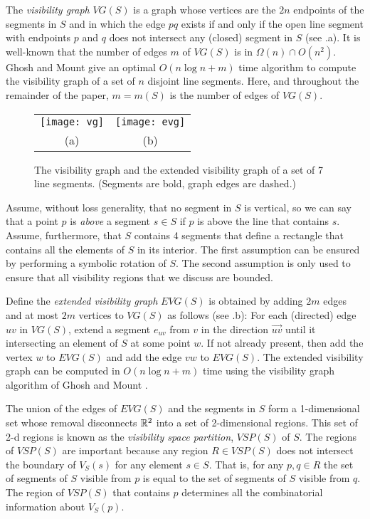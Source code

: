 \documentclass{patmorin}
\newcommand{\VG}{\mathit{VG}}
\newcommand{\EVG}{\mathit{EVG}}
\newcommand{\VSP}{\mathit{VSP}}
\begin{document}
The \emph{visibility graph} $\VG(S)$ is a graph whose vertices are the
$2n$ endpoints of the segments in $S$ and in which the edge $pq$ exists
if and only if the open line segment with endpoints $p$ and $q$ does
not intersect any (closed) segment in $S$ (see .a).  It is
well-known that the number of edges $m$ of $\VG(S)$ is in $\Omega(n)\cap
O(n^2)$.  Ghosh and Mount \cite{gm91} give an optimal $O(n\log n+ m)$
time algorithm to compute the visibility graph of a set of $n$ disjoint
line segments.  Here, and throughout the remainder of the paper, $m=m(S)$
is the number of edges of $\VG(S)$.

\begin{figure}
  \begin{center}
    \begin{tabular}{cc}
    \texttt{[image: vg]} & \texttt{[image: evg]} \\
    (a) & (b)
    \end{tabular}
  \end{center}
  \caption{The visibility graph and the extended visibility graph of a set
       of 7 line segments. (Segments are bold, graph edges are dashed.)}
\end{figure}

Assume, without loss generality, that no segment in $S$ is vertical, so
we can say that a point $p$ is \emph{above} a segment $s\in S$ if $p$ is
above the line that contains $s$.  Assume, furthermore, that $S$ contains
4 segments that define a rectangle that contains all the elements of $S$
in its interior.  The first assumption can be ensured by performing a
symbolic rotation of $S$.  The second assumption is only used to ensure
that all visibility regions that we discuss are bounded.

Define the \emph{extended visibility graph} $\EVG(S)$ is obtained
by adding $2m$ edges and at most $2m$ vertices to $\VG(S)$ as follows
(see .b): For each (directed) edge $uv$ in $\VG(S)$, extend a
segment $e_{uv}$ from $v$ in the direction $\overrightarrow{uv}$ until it
intersecting an element of $S$ at some point $w$.  If not already present,
then add the vertex $w$ to $\EVG(S)$ and add the edge $vw$ to $\EVG(S)$.
The extended visibility graph can be computed in $O(n\log n + m)$ time
using the visibility graph algorithm of Ghosh and Mount \cite{gm91}.

The union of the edges of $\EVG(S)$ and the segments in $S$ form a
1-dimensional set whose removal disconnects $\mathbb{R}^2$ into a set of
2-dimensional regions.  This set of 2-d regions is known as the
\emph{visibility space partition}, $\VSP(S)$ of $S$.  The regions
of $\VSP(S)$ are important because any region $R\in\VSP(S)$ does not
intersect the boundary of $V_S(s)$ for any element $s\in S$. That is,
for any $p,q\in R$ the set of segments of $S$ visible from $p$ is equal to
the set of segments of $S$ visible from $q$.  The region of $\VSP(S)$ that
contains $p$ determines all the combinatorial information about $V_S(p)$.
\end{document}
